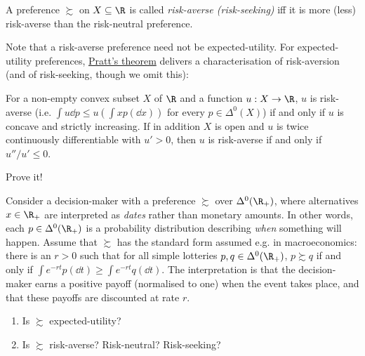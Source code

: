 \begin{definition}
	\label{definition:risk_av}
	A preference $\succsim$ on $X \subseteq \R$ is called \emph{risk-averse (risk-seeking)} iff it is more (less) risk-averse than the risk-neutral preference.
\end{definition}

Note that a risk-averse preference need not be expected-utility. For expected-utility preferences, \hyperref[theorem:pratt]{Pratt's theorem} delivers a characterisation of risk-aversion (and of risk-seeking, though we omit this):

\begin{corollary}
	\label{corollary:pratt_abs}
	For a non-empty convex subset $X$ of $\R$ and a function $u : X \to \R$, $u$ is risk-averse (i.e. $\int u \dd p \leq u\left( \int x p(\dd x) \right)$ for every $p \in \Delta^0(X)$) if and only if $u$ is concave and strictly increasing. If in addition $X$ is open and $u$ is twice continuously differentiable with $u'>0$, then $u$ is risk-averse if and only if $u''/u' \leq 0$.
\end{corollary}

\begin{exercise}
	\label{exercise:pratt_abs_pf}
	Prove it!
\end{exercise}

\begin{exercise}
	\label{exercise:time}
	Consider a decision-maker with a preference $\succsim$ over $\Delta^0(\R_+)$, where alternatives $x \in \R_+$ are interpreted as \emph{dates} rather than monetary amounts. In other words, each $p \in \Delta^0(\R_+)$ is a probability distribution describing \emph{when} something will happen. Assume that $\succsim$ has the standard form assumed e.g. in macroeconomics: there is an $r>0$ such that for all simple lotteries $p,q \in \Delta^0(\R_+)$, $p \succsim q$ if and only if $\int e^{-rt} p(\dd t) \geq \int e^{-rt} q(\dd t)$. The interpretation is that the decision-maker earns a positive payoff (normalised to one) when the event takes place, and that these payoffs are discounted at rate $r$.

	\begin{enumerate}[label=(\alph*)]
	
		\item Is $\succsim$ expected-utility?

		\item Is $\succsim$ risk-averse? Risk-neutral? Risk-seeking?
	
	\end{enumerate}
\end{exercise}

